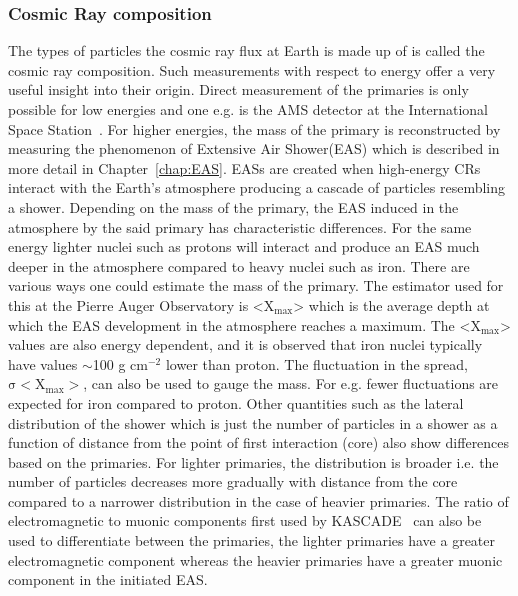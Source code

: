 \subsubsection*{Cosmic Ray composition}
\label{subsubsec:CRcompo}
The types of particles the cosmic ray flux at Earth is made up of is called the cosmic ray composition. Such measurements with respect to energy offer a very useful insight into their origin. Direct measurement of the primaries is only possible for low energies and one e.g. is the AMS detector at the International Space Station~\cite{PhysRevLett.110.141102}. For higher energies, the mass of the primary is reconstructed by measuring the phenomenon of Extensive Air Shower(EAS) which is described in more detail in Chapter~\ref{chap:EAS}. EASs are created when high-energy CRs interact with the Earth's atmosphere producing a cascade of particles resembling a shower.  Depending on the mass of the primary, the EAS induced in the atmosphere by the said primary has characteristic differences. For the same energy lighter nuclei such as protons will interact and produce an EAS much deeper in the atmosphere compared to heavy nuclei such as iron. There are various ways one could estimate the mass of the primary. The estimator used for this at the Pierre Auger Observatory is <$\mathrm{X_{max}}$> which is the average depth at which the EAS development in the atmosphere reaches a maximum. The <$\mathrm{X_{max}}$> values are also energy dependent, and it is observed that iron nuclei typically have values $\sim$100 g cm$^{-2}$ lower than proton. The fluctuation in the spread, $\mathrm{\sigma<X_{max}>}$, can also be used to gauge the mass. For e.g. fewer fluctuations are expected for iron compared to proton. Other quantities such as the lateral distribution of the shower which is just the number of particles in a shower as a function of distance from the point of first interaction (core) also show differences based on the primaries. For lighter primaries, the distribution is broader i.e. the number of particles decreases more gradually with distance from the core compared to a narrower distribution in the case of heavier primaries. The ratio of electromagnetic to muonic components first used by KASCADE~\cite{SCHATZ1998151} can also be used to differentiate between the primaries, the lighter primaries have a greater electromagnetic component whereas the heavier primaries have a greater muonic component in the initiated EAS.    

